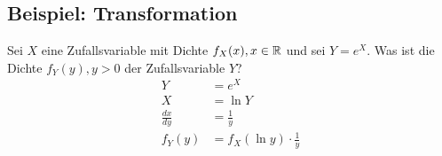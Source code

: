 \subsection{Beispiel: Transformation}
Sei $X$ eine Zufallsvariable mit Dichte $f_X(x), x \in \mathbb{R}$ und sei $Y = e^X$. Was ist die Dichte $f_Y(y), y > 0$ der Zufallsvariable $Y$?
\begin{align*}
  Y             & = e^X                          \\
  X             & = \ln Y                        \\
  \frac{dx}{dy} & = \frac{1}{y}                  \\
  f_Y(y)        & = f_X(\ln y) \cdot \frac{1}{y} \\
\end{align*}
\BoxEnd{}
